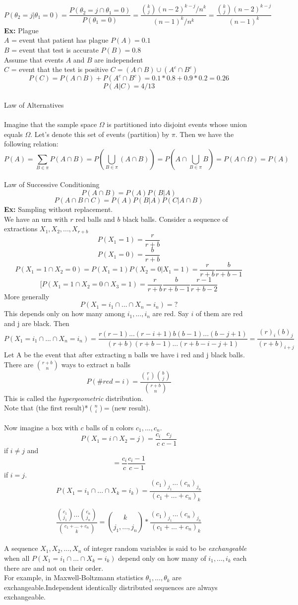 \[P(\theta_2=j|\theta_1=0)=\frac{P(\theta_2=j \cap
\theta_1=0)}{P(\theta_1=0)}=\frac{{k \choose j}
(n-2)^{k-j}/n^k}{(n-1)^k/n^k}=\frac{{k \choose j}
(n-2)^{k-j}}{(n-1)^k}\]
{\bf Ex:} Plague \\
$A$ = event that patient has plague   $P(A)=0.1$ \\
$B$ = event that test is accurate   $P(B)=0.8$ \\ 
Assume that events $A$ and $B$ are independent\\
$C$ = event that the test is positive $C=(A\cap B)\cup(A^c\cap B^c)$
\[P(C)=P(A\cap B)+P(A^c\cap B^c)=0.1*0.8+0.9*0.2=0.26\]
\[P(A|C)=4/13\]
\\
{\Large Law of Alternatives}
\\ \\
Imagine that the sample space $\Omega$ is partitioned into disjoint
events whose union equals $\Omega$. Let's denote this set of events
(partition) by $\pi$. Then we have the following relation:
\[P(A)=\sum_{B\in\pi}P(A\cap B)=P(\bigcup_{B\in\pi}(A\cap B))=
P(A\cap\bigcup_{B\in\pi}B)=P(A\cap\Omega)=P(A)\]
\\
{\Large Law of Successive Conditioning}
\\
\[P(A\cap B)=P(A)P(B|A)\]
\[P(A\cap B\cap C)=P(A)P(B|A)P(C|A\cap B)\]
{\bf Ex:} Sampling without replacement.\\
We have an urn with $r$ red balls and $b$ black balls. 
Consider a sequence of extractions $X_1, X_2, ..., X_{r+b}$
\[P(X_1=1)=\frac{r}{r+b}\]
\[P(X_1=0)=\frac{b}{r+b}\]
\[P(X_1=1\cap X_2=0)=P(X_1=1)P(X_2=0|X_1=1)=\frac{r}{r+b}\frac{b}{r+b-1}\]
\[[P(X_1=1\cap X_2=0\cap X_3=1)=\frac{r}{r+b}\frac{b}{r+b-1}
\frac{r-1}{r+b-2}\]
More generally
\[P(X_1=i_1\cap...\cap X_n=i_n)=?\]
This depends only on how many among $i_1,...,i_n$ are red. Say $i$ of
them are red and j are black. Then
\[P(X_1=i_1\cap...\cap X_n=i_n)=\frac{r(r-1)...(r-i+1)b(b-1)...(b-j+1)}
{(r+b)(r+b-1)...(r+b-i-j+1)}=\frac{(r)_i(b)_j}{(r+b)_{i+j}}\]
Let A be the event that after extracting n balls we have i red and j
black balls. There are $r+b \choose n$ ways to extract n balls
\[P(\#red=i)=\frac{{r \choose i}{b \choose j}}{{r+b \choose n}}\]
This is called the {\em hypergeometric} distribution.\\
Note that (the first result)*$n\choose i$= (new result). 
\\ \\
Now imagine a box with $c$ balls of n colors $c_1,...,c_n$.
\[P(X_1=i\cap X_2=j)=\frac{c_i}{c}\frac{c_j}{c-1}\]
if $i\neq j$ and
\[=\frac{c_i}{c}\frac{c_i-1}{c-1}\]
if $i=j$.
\[P(X_1=i_1\cap...\cap X_k=i_k)=\frac{(c_1)_{j_1}...(c_n)_{j_n}}{(c_1+...+c_n)_k}\]

\[\frac{{c_1 \choose j_1}...{c_n \choose j_n}}{{c_1+...+c_n \choose k}}=
{k \choose j_1,...,j_n}*\frac{(c_1)_{j_1}...(c_n)_{j_n}}{(c_1+...+c_n)_k}\]
\\
A sequence $X_1, X_2,...,X_n$ of integer random variables is said to be
{\em exchangeable} when all $P(X_1=i_1 \cap ... \cap X_k=i_k)$ depend
only on how many of $i_1,...,i_k$ each there are and not on their order.\\
For example, in Maxwell-Boltzmann statistics $\theta_1,...,\theta_k$ are
exchangeable.Independent identically distributed sequences are always exchangeable.

